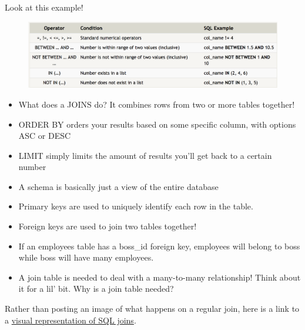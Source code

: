 \documentclass{42-en}
\begin{document}
\makeheaderfiles


	Look at this example! \\
    
            \begin{figure}[H]
                \begin{center}
                    \includegraphics[width=14cm]{operators.png}
                \end{center}
            \end{figure}

	\begin{itemize}\itemsep1pt 
		\item What does a JOINS do? It combines rows from two or more tables together! 
		\item ORDER BY orders your results based on some specific column, with options ASC or DESC
		\item LIMIT simply limits the amount of results you'll get back to a certain number
		\item A schema is basically just a view of the entire database 
		\item Primary keys are used to uniquely identify each row in the table. 
		\item Foreign keys are used to join two tables together!
		\item If an employees table has a boss\_id foreign key, employees will belong to boss while boss will have 
			many employees. 
		\item A join table is needed to deal with a many-to-many relationship! Think about it for a lil' bit. 
			Why is a join table needed? 
	\end{itemize}

	Rather than posting an image of what happens on a regular join, here is a link to a \href{https://blog.codinghorror.com/a-visual-explanation-of-sql-joins/}{visual representation 
	of SQL joins}.
\nextexercice
\end{document}
